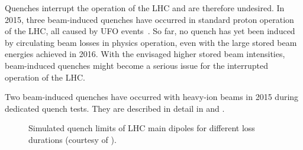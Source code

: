 

Quenches interrupt the operation of the LHC and are therefore undesired. In 2015, three beam-induced quenches have occurred in standard proton operation of the LHC, all caused by UFO events~\cite{IPAC16:TUPMW023}. So far, no quench has yet been induced by circulating beam losses in physics operation, even with the large stored beam energies achieved in 2016. With the envisaged higher stored beam intensities, beam-induced quenches might become a serious issue for the interrupted operation of the LHC. 

Two beam-induced quenches have occurred with heavy-ion beams in 2015 during dedicated quench tests. They are described in detail in \cite{accnote_bfpp_quench} and .

\begin{figure}[t]
  \centering
  \caption{Simulated quench limits of LHC main dipoles for different loss durations (courtesy of \cite{PhysRevSTAB.18.061002}).}  
  \label{pic:16070403}
  \end{figure}


